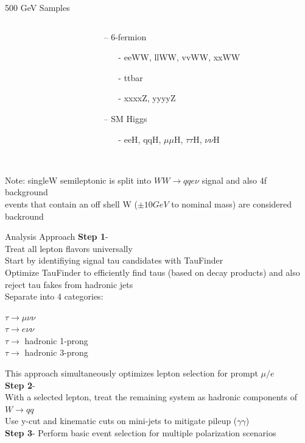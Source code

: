 \documentclass[10pt]{beamer}
\begin{document}
\begin{frame}{500 GeV Samples}
\begin{columns}
\begin{column}{0.5\textwidth}
\end{column}
\begin{column}{0.5\textwidth}
\begin{itemize}
	\item[--] 6-fermion
	\begin{itemize}
		\scriptsize
		\item[-]eeWW, llWW, vvWW, xxWW
		\item[-]ttbar
		\item[-]xxxxZ, yyyyZ
	\end{itemize}
	\item[--] SM Higgs
		\begin{itemize}
			\scriptsize
			\item[-] eeH, qqH, $\mu\mu$H, $\tau\tau$H, $\nu\nu$H
		\end{itemize}\quad\quad
\end{itemize}
\end{column}
\end{columns}
\quad \quad \\
\scriptsize
Note: singleW semileptonic is split into $WW\rightarrow qqe\nu$ signal and also 4f background\\
events that contain an off shell W ($\pm 10 GeV$ to nominal mass) are considered backround

\end{frame}

\begin{frame}{Analysis Approach}
\textbf{Step 1}-\\
Treat all lepton flavors universally\\
Start by identifiying signal tau candidates with TauFinder\\
\scriptsize
\quad	Optimize TauFinder to efficiently find taus (based on decay products) and also reject tau fakes from hadronic jets\\
\quad \quad	\quad Separate into 4 categories:\\
\begin{center}		
		$\tau\rightarrow \mu \nu \nu$ \\
		$\tau\rightarrow e \nu \nu$\\
		$\tau \rightarrow$ hadronic 1-prong\\
		$\tau \rightarrow$ hadronic 3-prong\\
\end{center}
\quad \quad \quad	This approach simultaneously optimizes lepton selection for prompt $\mu/e$\\
	\normalsize
\textbf{Step 2}-\\
With a selected lepton, treat the remaining system as hadronic components of $W\rightarrow qq$\\
\quad \quad \scriptsize Use y-cut and kinematic cuts on mini-jets to mitigate pileup ($\gamma \gamma$)\\
\normalsize
\textbf{Step 3}- Perform basic event selection for multiple polarization scenarios\\
\end{frame}
\end{document}
